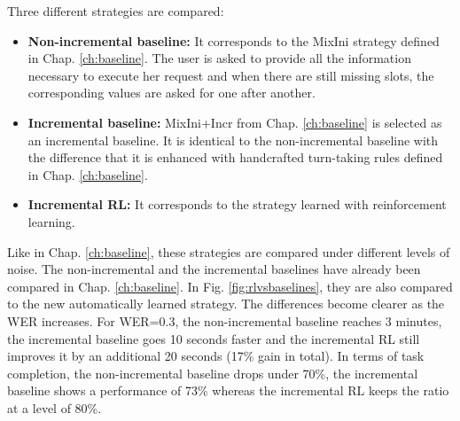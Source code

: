 \begin{figure*}[b]
\begin{minipage}{.47\textwidth}
\end{minipage}
\caption{Mean dialogue duration and task for the non-incremental, the baseline incremental and the RL incremental strategies under different noise conditions.}
\label{fig:rlvsbaselines}
\end{figure*}
    
    	Three different strategies are compared:
        \begin{itemize}
        	\item \textbf{Non-incremental baseline:} It corresponds to the MixIni strategy defined in Chap. \ref{ch:baseline}. The user is asked to provide all the information necessary to execute her request and when there are still missing slots, the corresponding values are asked for one after another.
            \item \textbf{Incremental baseline:} MixIni+Incr from Chap. \ref{ch:baseline} is selected as an incremental baseline. It is identical to the non-incremental baseline with the difference that it is enhanced with handcrafted turn-taking rules defined in Chap. \ref{ch:baseline}.
            \item \textbf{Incremental RL:} It corresponds to the strategy learned with reinforcement learning.
        \end{itemize}
        
        Like in Chap. \ref{ch:baseline}, these strategies are compared under different levels of noise. The non-incremental and the incremental baselines have already been compared in Chap. \ref{ch:baseline}. In Fig. \ref{fig:rlvsbaselines}, they are also compared to the new automatically learned strategy. The differences become clearer as the WER increases. For WER=0.3, the non-incremental baseline reaches 3 minutes, the incremental baseline goes 10 seconds faster and the incremental RL still improves it by an additional 20 seconds (17\% gain in total). In terms of task completion, the non-incremental baseline drops under 70\%, the incremental baseline shows a performance of 73\% whereas the incremental RL keeps the ratio at a level of 80\%.

